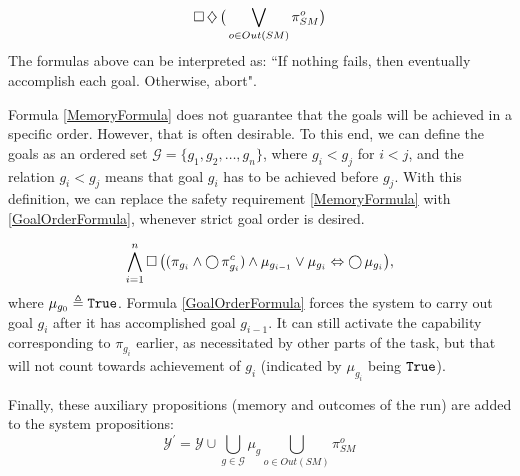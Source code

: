 \begin{equation}\label{SuccessLivenessFormula}
	\operatorname{\Box} \operatorname{\diamondsuit} \big( \bigvee \limits_{o \in Out(SM)} \pi_{SM}^{o} \big)
\end{equation}
The formulas above can be interpreted as: ``If nothing fails, then eventually accomplish each goal. Otherwise, abort". 

Formula \eqref{MemoryFormula} does not guarantee that the goals will be achieved in a specific order.
However, that is often desirable.
To this end, we can define the goals as an ordered set $\mathcal{G} = \{ g_1, g_2, \ldots, g_n \}$, where $g_i < g_j$ for $i<j$, and the relation $g_i < g_j$ means that goal $g_i$ has to be achieved before $g_j$.
With this definition, we can replace the safety requirement \eqref{MemoryFormula} with \eqref{GoalOrderFormula}, whenever strict goal order is desired.

\begin{equation}\label{GoalOrderFormula}
	\bigwedge \limits_{i = 1}^n \operatorname{\Box} \big( (\pi_{g_i} \wedge \operatorname{\bigcirc} \pi_{g_i}^c) \wedge \mu_{g_{i-1}} \vee \mu_{g_i} \Leftrightarrow \operatorname{\bigcirc} \mu_{g_i} \big),
\end{equation}
where $\mu_{g_0} \triangleq \mathtt{True}$.
Formula \eqref{GoalOrderFormula} forces the system to carry out goal $g_i$ after it has accomplished goal $g_{i-1}$.
It can still activate the capability corresponding to $\pi_{g_i}$ earlier, as necessitated by other parts of the task, but that will not count towards achievement of $g_i$ (indicated by $\mu_{g_i}$ being $\mathtt{True}$).

Finally, these auxiliary propositions (memory and outcomes of the run) are added to the system propositions: $$\mathcal{Y}^\prime = \mathcal{Y} \cup \bigcup \limits_{g \in \mathcal{G}} \mu_g \bigcup \limits_{o \in Out(SM)} \pi_{SM}^o$$

